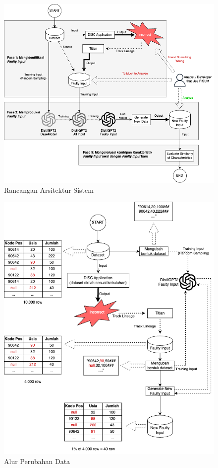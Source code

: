   \begin{figure}[H]
    \centering
    \includegraphics[scale=0.44]{gambar/ArsitekturFISUM.png}
  
    \caption{Rancangan Arsitektur Sistem}
    \label{fig:arsitektur}
  \end{figure}

  \begin{figure}[H]
    \centering
    \includegraphics[scale=0.4]{gambar/AlurPerubahanData.png}
  
    \caption{Alur Perubahan Data}
    \label{fig:AlurPerubahanData}

  \end{figure}





